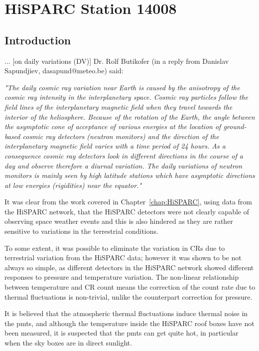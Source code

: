 \chapter{HiSPARC Station 14008}\label{chap:HiSPARC_14008}

\section{Introduction}\label{sec:HS_14008_intro}


... [on daily variations (DV)] Dr. Rolf Butikofer (in a reply from Danislav Sapundjiev, dasapund@meteo.be) said:

\textit{"The daily cosmic ray variation near Earth is caused by the anisotropy of the cosmic ray intensity in the interplanetary space. Cosmic ray particles follow the field lines of the interplanetary magnetic field when they travel towards the interior of the heliosphere. Because of the rotation of the Earth, the angle between the asymptotic cone of acceptance of various energies at the location of ground-based cosmic ray detectors (neutron monitors) and the direction of the interplanetary magnetic field varies with a time period of 24 hours. As a consequence cosmic ray detectors look in different directions in the course of a day and observe therefore a diurnal variation. The daily variations of neutron monitors is mainly seen by high latitude stations which have asymptotic directions at low energies (rigidities) near the equator."}



It was clear from the work covered in Chapter~\ref{chap:HiSPARC}, using data from the HiSPARC network, that the HiSPARC detectors were not clearly capable of observing space weather events and this is also hindered as they are rather sensitive to variations in the terrestrial conditions. 

To some extent, it was possible to eliminate the variation in CRs due to terrestrial variation from the HiSPARC data; however it was shown to be not always so simple, as different detectors in the HiSPARC network showed different responses to pressure and temperature variation. The non-linear relationship between temperature and CR count means the correction of the count rate due to thermal fluctuations is non-trivial, unlike the counterpart correction for pressure. 

It is believed that the atmospheric thermal fluctuations induce thermal noise in the \glspl{pmt}, and although the temperature inside the HiSPARC roof boxes have not been measured, it is suspected that the \glspl{pmt} can get quite hot, in particular when the sky boxes are in direct sunlight.

